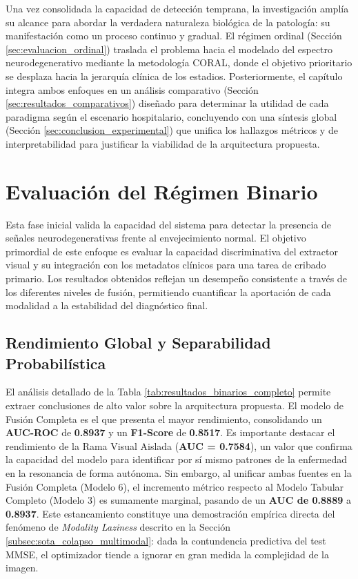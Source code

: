 \documentclass[12pt, oneside, english, spanish]{book}
\begin{document}
Una vez consolidada la capacidad de detección temprana, la investigación amplía su alcance para abordar la verdadera naturaleza biológica de la patología: su manifestación como un proceso continuo y gradual. El régimen ordinal (Sección \ref{sec:evaluacion_ordinal}) traslada el problema hacia el modelado del espectro neurodegenerativo mediante la metodología CORAL, donde el objetivo prioritario se desplaza hacia la jerarquía clínica de los estadios. Posteriormente, el capítulo integra ambos enfoques en un análisis comparativo (Sección \ref{sec:resultados_comparativos}) diseñado para determinar la utilidad de cada paradigma según el escenario hospitalario, concluyendo con una síntesis global (Sección \ref{sec:conclusion_experimental}) que unifica los hallazgos métricos y de interpretabilidad para justificar la viabilidad de la arquitectura propuesta.

\section{Evaluación del Régimen Binario} \label{sec:evaluacion_binaria}

Esta fase inicial valida la capacidad del sistema para detectar la presencia de señales neurodegenerativas frente al envejecimiento normal. El objetivo primordial de este enfoque es evaluar la capacidad discriminativa del extractor visual y su integración con los metadatos clínicos para una tarea de cribado primario. Los resultados obtenidos reflejan un desempeño consistente a través de los diferentes niveles de fusión, permitiendo cuantificar la aportación de cada modalidad a la estabilidad del diagnóstico final.

\subsection{Rendimiento Global y Separabilidad Probabilística} \label{subsec:binario_rendimiento_global}

El análisis detallado de la Tabla \ref{tab:resultados_binarios_completo} permite extraer conclusiones de alto valor sobre la arquitectura propuesta. El modelo de Fusión Completa es el que presenta el mayor rendimiento, consolidando un \textbf{AUC-ROC} de \textbf{0.8937} y un \textbf{F1-Score} de \textbf{0.8517}. Es importante destacar el rendimiento de la Rama Visual Aislada (\textbf{AUC = 0.7584}), un valor que confirma la capacidad del modelo para identificar por sí mismo patrones de la enfermedad en la resonancia de forma autónoma. Sin embargo, al unificar ambas fuentes en la Fusión Completa (Modelo 6), el incremento métrico respecto al Modelo Tabular Completo (Modelo 3) es sumamente marginal, pasando de un \textbf{AUC de 0.8889} a \textbf{0.8937}. Este estancamiento constituye una demostración empírica directa del fenómeno de \textit{Modality Laziness} descrito en la Sección \ref{subsec:sota_colapso_multimodal}: dada la contundencia predictiva del test MMSE, el optimizador tiende a ignorar en gran medida la complejidad de la imagen. 
\end{document}
